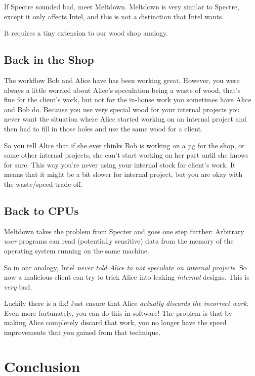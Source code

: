 \documentclass{article}
\begin{document}
If Spectre sounded bad, meet Meltdown. Meltdown is very similar to Spectre,
except it only affects Intel, and this is not a distinction that Intel wants.

It requires a tiny extension to our wood shop analogy.

\subsection*{Back in the Shop}

The workflow Bob and Alice have has been working great. However, you were
always a little worried about Alice's speculation being a waste of wood, that's
fine for the client's work, but not for the in-house work you sometimes have
Alice and Bob do. Because you use very special wood for your internal projects
you never want the situation where Alice started working on an internal project
and then had to fill in those holes and use the same wood for a client.

So you tell Alice that if she ever thinks Bob is working on a jig for the shop,
or some other internal projects, she can't start working on her part until she
knows for sure. This way you're never using your internal stock for client's
work. It means that it might be a bit slower for internal project, but you are
okay with the waste/speed trade-off.

\subsection*{Back to CPUs}

Meltdown takes the problem from Specter and goes one step further: Arbitrary
\emph{user} programs can read (potentially sensitive) data from the memory of
{the operating system} running on the same machine.

So in our analogy, Intel \emph{never told Alice to not speculate on internal
projects}. So now a malicious client can try to trick Alice into leaking
\emph{internal} designs. This is \emph{very} bad.

Luckily there is a fix! Just ensure that Alice \emph{actually discards the
incorrect work}. Even more fortunately, you can do this in software! The
problem is that by making Alice completely discard that work, you no longer
have the speed improvements that you gained from that technique.

\section{Conclusion}
\end{document}
